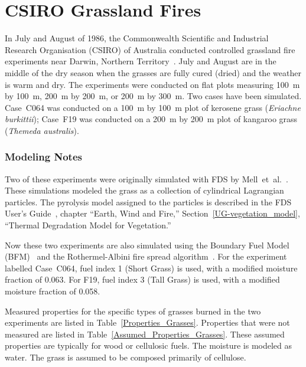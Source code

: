 \section{CSIRO Grassland Fires}
\label{CSIRO_Grassland_Fires_Description}

In July and August of 1986, the Commonwealth Scientific and Industrial Research Organisation (CSIRO) of Australia conducted controlled grassland fire experiments near Darwin, Northern Territory~\cite{Cheney:IJWF1993}. July and August are in the middle of the dry season when the grasses are fully cured (dried) and the weather is warm and dry. The experiments were conducted on flat plots measuring 100~m by 100~m, 200~m by 200~m, or 200~m by 300~m. Two cases have been simulated. Case~C064 was conducted on a 100~m by 100~m plot of kerosene grass ({\it Eriachne burkittii}); Case~F19 was conducted on a 200~m by 200~m plot of kangaroo grass ({\it Themeda australis}).

\subsubsection{Modeling Notes}

Two of these experiments were originally simulated with FDS by Mell~et~al.~\cite{Mell:IJWF2007}. These simulations modeled the grass as a collection of cylindrical Lagrangian particles. The pyrolysis model assigned to the particles is described in the FDS User's Guide~\cite{FDS_Users_Guide}, chapter ``Earth, Wind and Fire,'' Section~\ref{UG-vegetation_model}, ``Thermal Degradation Model for Vegetation.''

Now these two experiments are also simulated using the Boundary Fuel Model (BFM)~\cite{Perez-Ramirez:FT2017} and the Rothermel-Albini fire spread algorithm~\cite{Rothermel:1972,Albini:1976}. For the experiment labelled Case~C064, fuel index 1 (Short Grass) is used, with a modified moisture fraction of 0.063. For F19, fuel index 3 (Tall Grass) is used, with a modified moisture fraction of 0.058.

Measured properties for the specific types of grasses burned in the two experiments are listed in Table~\ref{Properties_Grasses}. Properties that were not measured are listed in Table~\ref{Assumed_Properties_Grasses}. These assumed properties are typically for wood or cellulosic fuels. The moisture is modeled as water. The grass is assumed to be composed primarily of cellulose.



